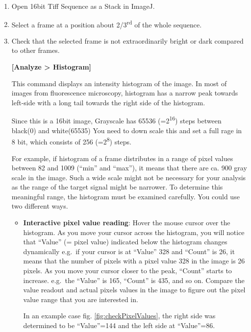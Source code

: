 \documentclass{article}
\begin{document}
\begin{enumerate}

\item Open 16bit Tiff Sequence as a Stack in ImageJ.

\item Select a frame at a position about 2/3\textsuperscript{rd} of the whole
sequence.

\item Check that the selected frame is not extraordinarily bright or dark compared to other frames.

\textbf{{[}Analyze \textgreater{} Histogram{]}}

This command displays an intensity histogram of the image. In most of images from fluorescence microscopy, histogram has a narrow peak towards left-side with a long tail towards the right side of the histogram. 

Since this is a 16bit image, Grayscale has 65536
(=2\textsuperscript{16}) steps between black(0) and white(65535) You
need to down scale this and set a full rage in 8 bit, which consists of
256 (=2\textsuperscript{8}) steps.

For example, if histogram of a frame distributes in a range of pixel
values between 82 and 1009 (``min'' and ``max''), it means that there are ca. 900 gray scale in the image. Such a wide scale might not be necessary for your analysis as the range of the target signal might be narrower. To determine this meaningful range, the histogram must be examined carefully. You could use two different ways.

\begin{itemize}
\item \textbf{Interactive pixel value reading}: Hover the mouse cursor
over the histogram. As you move your cursor across the histogram, you will notice that ``Value'' (= pixel value) indicated below the histogram changes dynamically e.g.~if your cursor is at ``Value'' 328 and ``Count'' is 26, it means that the number of pixels with a pixel value 328 in the image is 26 pixels. As you move your cursor closer to the peak, ``Count''
starts to increase. e.g.~the ``Value'' is 165, ``Count'' is 435, and so
on. Compare the value readout and actual pixels values in the image to
figure out the pixel value range that you are interested in.

In an example case fig. \ref{fig:checkPixelValues}, the right side was determined to be ``Value''=144 and the left side at ``Value''=86.



\end{itemize}
\end{enumerate}
\end{document}
